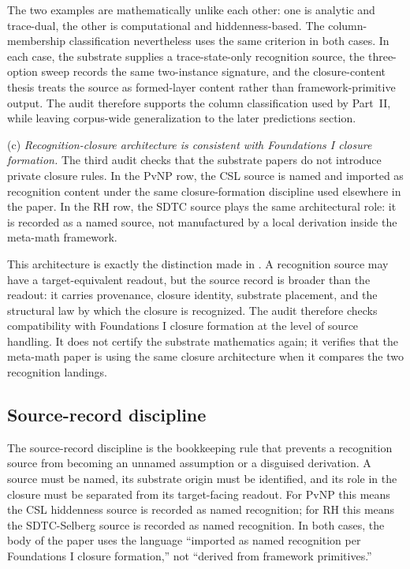 \documentclass[11pt]{article}
\theoremstyle{definition}
\begin{document}
The two examples are mathematically unlike each other: one is analytic
and trace-dual, the other is computational and hiddenness-based.  The
column-membership classification nevertheless uses the same criterion in
both cases.  In each case, the substrate supplies a trace-state-only
recognition source, the three-option sweep records the same
two-instance signature, and the closure-content thesis treats the source
as formed-layer content rather than framework-primitive output.  The
audit therefore supports the column classification used by Part~II, while
leaving corpus-wide generalization to the later predictions section.

(c) \emph{Recognition-closure architecture is consistent with Foundations
I closure formation.}  The third audit checks that the substrate papers do
not introduce private closure rules.  In the PvNP row, the CSL source
\cite{Tsiokos2026CSL} is named and imported as recognition content under
the same closure-formation discipline used elsewhere in the paper.  In
the RH row, the SDTC source \cite{Tsiokos2026SDTC} plays the same
architectural role: it is recorded as a named source, not manufactured by
a local derivation inside the meta-math framework.

This architecture is exactly the distinction made in
.  A recognition source may have a
target-equivalent readout, but the source record is broader than the
readout: it carries provenance, closure identity, substrate placement,
and the structural law by which the closure is recognized.  The audit
therefore checks compatibility with Foundations I closure formation at
the level of source handling.  It does not certify the substrate
mathematics again; it verifies that the meta-math paper is using the same
closure architecture when it compares the two recognition landings.

\subsection{Source-record discipline}\label{sec:audit:source-record-discipline}

The source-record discipline is the bookkeeping rule that prevents a
recognition source from becoming an unnamed assumption or a disguised
derivation.  A source must be named, its substrate origin must be
identified, and its role in the closure must be separated from its
target-facing readout.  For PvNP this means the CSL hiddenness source is
recorded as named recognition; for RH this means the SDTC-Selberg source
is recorded as named recognition.  In both cases, the body of the paper
uses the language ``imported as named recognition per Foundations I
closure formation,'' not ``derived from framework primitives.''
\end{document}
